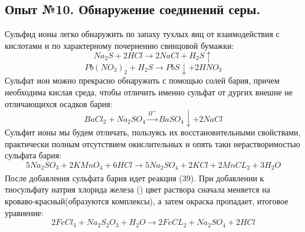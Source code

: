 \documentclass[a4paper,12pt]{article}
\newcommand{\RomanNumeralCaps}[1]
    {\MakeUppercase{\romannumeral #1}}
\begin{document}
\subsection{Опыт №10. Обнаружение соединений серы.}
Сульфид ионы легко обнаружить по запаху тухлых яиц от взаимодействия с кислотами и по характерному почернению свинцовой бумажки:
\begin{equation}
    Na_2S + 2HCl \xrightarrow[]{} 2NaCl + H_2S\uparrow
\end{equation}
\begin{equation}
    Pb(NO_3)_2 + H_2S \xrightarrow[]{} PbS\downarrow + 2HNO_3
\end{equation}
Сульфат ион можно прекрасно обнаружить с помощью солей бария, причем необходима кислая среда, чтобы отличить именно сульфат от дургих внешне не отличающихся осадков бария:
\begin{equation}
  BaCl_2 + Na_2SO_4 \xrightarrow[]{H^+} BaSO_4\downarrow + 2NaCl 
\end{equation}
Сульфит ионы мы будем отличать, пользуясь их восстановительными свойствами, практически полным отсутствием окислительных и опять таки нерастворимостью сульфата бария:
\begin{equation}
    5Na_2SO_3 + 2KMnO_4 + 6HCl \xrightarrow[]{} 5Na_2SO_4 +  2KCl + 2MnCL_2 + 3H_2O
\end{equation}
После добавления сульфата бария идет реакция (39).
При добавлении к тиосульфату натрия хлорида железа (\RomanNumeralCaps{3}) цвет раствора сначала меняется на кроваво-красный(образуются комплексы), а затем окраска пропадает, итоговое уравнение:
\begin{equation}
    2FeCl_3 + Na_2S_2O_3 + H_2O \xrightarrow[]{} 2FeCL_2 + Na_2SO_4 + 2HCl
\end{equation}
\end{document}
